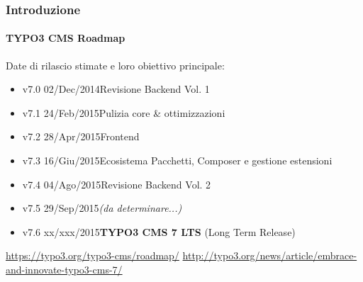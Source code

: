\begin{frame}[fragile]
	\frametitle{Introduzione}
	\framesubtitle{TYPO3 CMS Roadmap}

	Date di rilascio stimate e loro obiettivo principale:

	\begin{itemize}
		\item v7.0 \tabto{1.0cm}02/Dec/2014\tabto{3.4cm}Revisione Backend Vol. 1
		\item v7.1 \tabto{1.0cm}24/Feb/2015\tabto{3.4cm}Pulizia core \& ottimizzazioni
		\item v7.2 \tabto{1.0cm}28/Apr/2015\tabto{3.4cm}Frontend
		\item v7.3 \tabto{1.0cm}16/Giu/2015\tabto{3.4cm}Ecosistema Pacchetti, Composer\newline
			\tabto{3.4cm}e gestione estensioni
		\item
			\begingroup
				\color{typo3orange}
					v7.4 \tabto{1.0cm}04/Ago/2015\tabto{3.4cm}Revisione Backend Vol. 2
			\endgroup

		\item v7.5 \tabto{1.0cm}29/Sep/2015\tabto{3.4cm}\textit{(da determinare...)}
		\item v7.6 \tabto{1.0cm}xx/xxx/2015\tabto{3.4cm}\textbf{TYPO3 CMS 7 LTS} (Long Term Release)
	\end{itemize}

	\smaller
		\url{https://typo3.org/typo3-cms/roadmap/}\newline
		\url{http://typo3.org/news/article/embrace-and-innovate-typo3-cms-7/}
	\normalsize

\end{frame}

